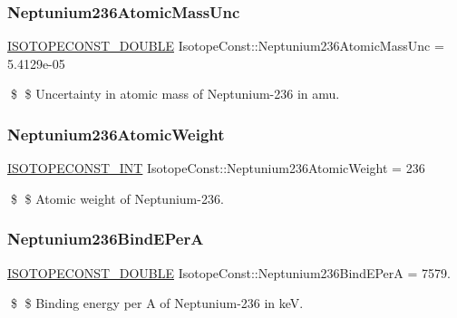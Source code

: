 \subsubsection{\texorpdfstring{Neptunium236\+Atomic\+Mass\+Unc}{Neptunium236AtomicMassUnc}}
{\footnotesize\ttfamily \mbox{\hyperlink{group___isotope_const-_macros_ga8f45a7272ce02c0b4c65c44636ed719a}{I\+S\+O\+T\+O\+P\+E\+C\+O\+N\+S\+T\+\_\+\+D\+O\+U\+B\+LE}} Isotope\+Const\+::\+Neptunium236\+Atomic\+Mass\+Unc = 5.\+4129e-\/05}

\$ \$ Uncertainty in atomic mass of Neptunium-\/236 in amu. \mbox{\label{group___isotope_const-_neptunium-_np236_ga9901d8f659dcc070f29dd7892be52b41}} 
\subsubsection{\texorpdfstring{Neptunium236\+Atomic\+Weight}{Neptunium236AtomicWeight}}
{\footnotesize\ttfamily \mbox{\hyperlink{group___isotope_const-_macros_ga5f18360b3e99483a35c32d789e62621c}{I\+S\+O\+T\+O\+P\+E\+C\+O\+N\+S\+T\+\_\+\+I\+NT}} Isotope\+Const\+::\+Neptunium236\+Atomic\+Weight = 236}

\$ \$ Atomic weight of Neptunium-\/236. \mbox{\label{group___isotope_const-_neptunium-_np236_ga2f0287ea387cf0a78bc3ae357f881f84}} 
\subsubsection{\texorpdfstring{Neptunium236\+Bind\+E\+PerA}{Neptunium236BindEPerA}}
{\footnotesize\ttfamily \mbox{\hyperlink{group___isotope_const-_macros_ga8f45a7272ce02c0b4c65c44636ed719a}{I\+S\+O\+T\+O\+P\+E\+C\+O\+N\+S\+T\+\_\+\+D\+O\+U\+B\+LE}} Isotope\+Const\+::\+Neptunium236\+Bind\+E\+PerA = 7579.}

\$ \$ Binding energy per A of Neptunium-\/236 in keV. \mbox{\label{group___isotope_const-_neptunium-_np236_ga8fec5a224b035abba5fb98af7ed77d38}} 
